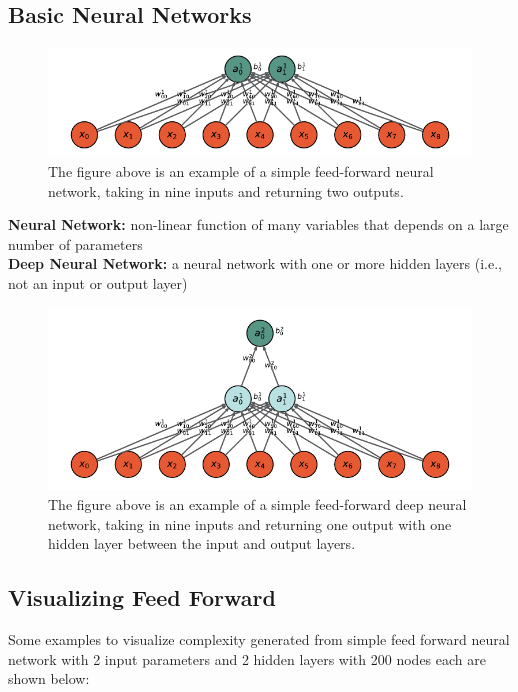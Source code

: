\subsection{Basic Neural Networks}

\begin{figure}[H]
\centering
\includegraphics{../figures/neural_network.pdf}
\caption{The figure above is an example of a simple feed-forward neural network, taking in nine inputs and returning two outputs.}
\end{figure}

\noindent \textbf{Neural Network:} non-linear function of many variables that depends on a large number of parameters \\
\textbf{Deep Neural Network:} a neural network with one or more hidden layers (i.e., not an input or output layer)

\begin{figure}[H]
\centering
\includegraphics{../figures/DNN.pdf}
\caption{The figure above is an example of a simple feed-forward deep neural network, taking in nine inputs and returning one output with one hidden layer between the input and output layers.}
\end{figure}
			
\subsection{Visualizing Feed Forward}

Some examples to visualize complexity generated from simple feed forward neural network with 2 input parameters and 2 hidden layers with 200 nodes each are shown below:

